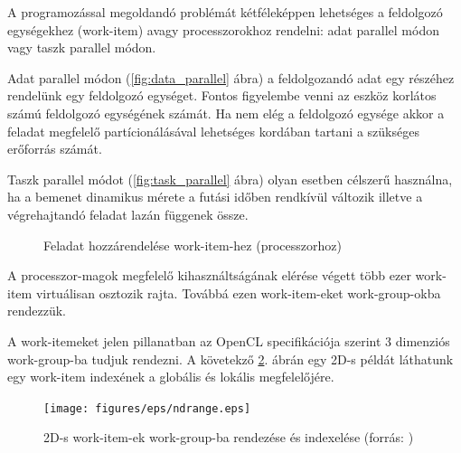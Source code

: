	A programozással megoldandó problémát kétféleképpen lehetséges a feldolgozó
	egységekhez (work-item) avagy processzorokhoz rendelni:
	adat parallel módon vagy taszk parallel módon.
	
	Adat parallel módon (\ref{fig:data_parallel} ábra) a feldolgozandó adat egy
	részéhez rendelünk egy feldolgozó egységet. Fontos figyelembe venni az eszköz korlátos
	számú feldolgozó egységének számát. Ha nem elég a feldolgozó egysége akkor a
	feladat megfelelő partícionálásával lehetséges kordában tartani a szükséges
	erőforrás számát.
	
	Taszk parallel módot (\ref{fig:task_parallel} ábra) olyan esetben célszerű
	használna, ha a bemenet dinamikus mérete a futási időben rendkívül változik
	illetve a végrehajtandó feladat lazán függenek össze.
	
	\begin{figure}[!ht]
		\centering
		\hfil
		\caption{Feladat hozzárendelése work-item-hez (processzorhoz)}
		\label{fig:parallel}
	\end{figure}
	A processzor-magok megfelelő kihasználtságának elérése végett több ezer
	work-item virtuálisan osztozik rajta.
	Továbbá ezen work-item-eket work-group-okba rendezzük.
	
	A work-itemeket jelen pillanatban az OpenCL specifikációja \cite{opencl} szerint 3 dimenziós
	work-group-ba tudjuk rendezni. A követekző \ref{fig:ndrange}. ábrán egy 2D-s példát láthatunk egy work-item indexének a globális
	és lokális megfelelőjére.
	
	\begin{figure}[!h]
		\centering
		\texttt{[image: figures/eps/ndrange.eps]}
		\caption[2D-s work-item-ek work-group-ba rendezése és indexelése]{2D-s work-item-ek work-group-ba rendezése és indexelése
		(forrás: \cite{opencl})}
		\label{fig:ndrange} 
	\end{figure}

